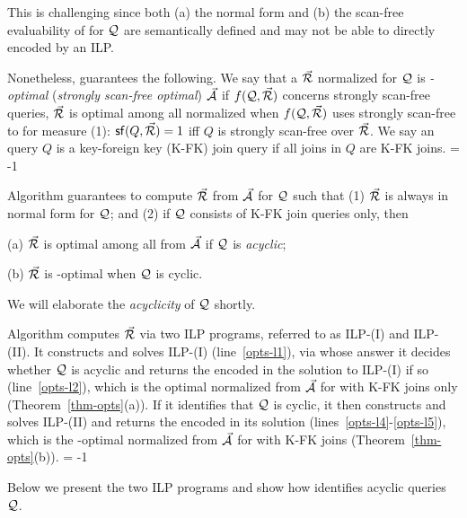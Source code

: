 {This is challenging since both (a) the normal form and (b) the
scan-free evaluability of \bdss for $\mathcal Q$ are semantically defined
and may not be able to directly encoded by an ILP.

\vspace{1ex}
Nonetheless, \opts guarantees the following. We say that
a \bds $\vec{{\mathcal R}}$ normalized for $\mathcal Q$ is {\em \ssf-optimal}
({\em strongly scan-free optimal}) \wrt $\vec{{\mathcal A}}$ if $f(\mathcal Q, \vec{{\mathcal R}})$
concerns strongly scan-free queries, \ie $\vec{{\mathcal R}}$ is optimal
among all normalized \bdss when $f(\mathcal Q, \vec{{\mathcal R}})$ uses strongly
scan-free to for measure (1): ${\mathsf{sf}}(Q,\allowbreak \vec{{\mathcal R}}) \allowbreak = \allowbreak 1$
iff $Q$ is strongly scan-free over $\vec{{\mathcal R}}$. We say an \SPC
query $Q$ is a key-foreign key (K-FK) join query if all joins in
$Q$ are K-FK joins.
\looseness = -1

\vspace{-0.3ex}
\begin{theorem}\label{thm-opts}
Algorithm \opts guarantees to compute $\vec{{\mathcal R}}$ from $\vec{{\mathcal A}}$
for $\mathcal Q$ such that
(1) $\vec{{\mathcal R}}$ is always in normal form for $\mathcal Q$; and
(2) if $\mathcal Q$ consists of K-FK join \SPC queries only, then
\bi
\item[(a)] $\vec{{\mathcal R}}$ is optimal among all \bdss from $\vec{{\mathcal A}}$
  if $\mathcal Q$ is {\em acyclic}; 
\item[(b)] $\vec{{\mathcal R}}$ is \ssf-optimal when $\mathcal Q$ is cyclic. 
\ei
\vspace{-3.5ex}
\end{theorem}

We will elaborate the {\em acyclicity} of $\mathcal Q$ shortly.

Algorithm \opts computes $\vec{{\mathcal R}}$ via two ILP programs,
referred to as ILP-(I) and ILP-(II).
It constructs and solves ILP-(I) (line~\ref{opts-l1}),
via whose answer it decides whether $\mathcal Q$ is acyclic and
returns the \bds encoded in the solution to ILP-(I) if so
(line~\ref{opts-l2}), which is the optimal normalized \bds from
$\vec{{\mathcal A}}$ for \SPC with K-FK joins only
(Theorem~\ref{thm-opts}(a)). 
If it identifies that $\mathcal Q$ is cyclic, it then constructs and
solves ILP-(II) and returns the \bds encoded in its solution
(lines~\ref{opts-l4}-\ref{opts-l5}), which is the \ssf-optimal
normalized \bds from $\vec{{\mathcal A}}$ for \SPC with K-FK joins
(Theorem~\ref{thm-opts}(b)).
\looseness = -1


\vspace{0.8ex}
Below we present the two ILP programs and show how \opts
identifies acyclic queries $\mathcal Q$. 


}
